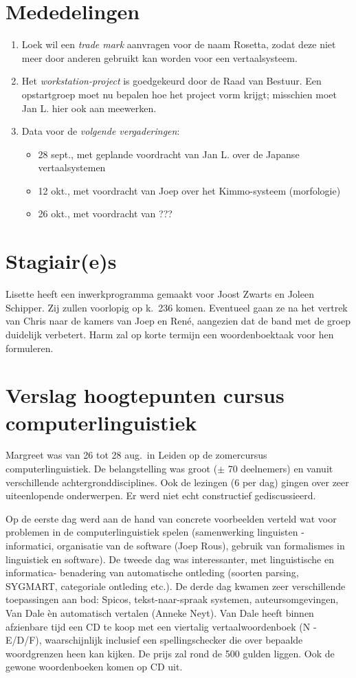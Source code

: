 \section{Mededelingen}
\begin{enumerate}
  \item Loek wil een {\em trade mark\/} aanvragen voor de naam Rosetta, zodat 
deze niet meer door anderen gebruikt kan worden voor een vertaalsysteem.
  \item Het {\em workstation-project\/} is goedgekeurd door de Raad van 
Bestuur. Een opstartgroep moet nu bepalen hoe het project vorm krijgt; 
misschien moet Jan L. hier ook aan meewerken.
  \item Data voor de {\em volgende vergaderingen\/}:
     \begin{itemize}
       \item 28 sept., met geplande voordracht van Jan L. over de Japanse 
             vertaalsystemen
       \item 12 okt., met voordracht van Joep over het Kimmo-systeem 
             (morfologie)
       \item 26 okt., met voordracht van ???
      \end{itemize}
\end{enumerate}

\section{Stagiair(e)s}
Lisette heeft een inwerkprogramma gemaakt voor Joost Zwarts en Joleen 
Schipper. Zij zullen voorlopig op k.\ 236 komen. Eventueel gaan ze na het 
vertrek van Chris naar de kamers van Joep en Ren\'{e}, aangezien dat de band 
met de groep 
duidelijk verbetert. Harm zal op korte termijn een woordenboektaak voor hen 
formuleren.

\section{Verslag hoogtepunten cursus computerlinguistiek}
Margreet was van 26 tot 28 aug.\ in Leiden op de zomercursus 
computerlinguistiek. De belangstelling was groot ($\pm$ 70 deelnemers) en vanuit 
verschillende achtergronddisciplines. Ook de lezingen (6 per dag) gingen over 
zeer 
uiteenlopende onderwerpen. Er werd niet echt constructief gediscussieerd. 

Op de eerste dag werd aan de hand van 
concrete voorbeelden verteld wat voor problemen in de computerlinguistiek spelen 
(samenwerking linguisten - informatici, organisatie van de software (Joep 
Rous), gebruik van formalismes in linguistiek en software). De tweede dag was 
interessanter, met linguistische en informatica- benadering van automatische 
ontleding (soorten parsing, SYGMART, categoriale ont\-leding etc.). De derde dag 
kwamen zeer verschillende toepassingen aan bod: Spicos, tekst-naar-spraak 
systemen, auteursomgevingen, Van Dale \`{e}n automatisch vertalen (Anneke Neyt).
Van Dale heeft binnen afzienbare tijd een CD te koop met een viertalig 
vertaalwoordenboek (N - E/D/F), waarschijnlijk inclusief een spellingschecker 
die over bepaalde woordgrenzen heen kan kijken. De prijs zal rond de 500 gulden 
liggen. Ook de gewone woordenboeken komen op CD uit.

